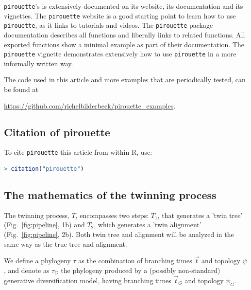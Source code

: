 \verb;pirouette;'s is extensively documented on its website,
its documentation and its vignettes.
The \verb;pirouette; website is a good starting point to learn
how to use \verb;pirouette;, as it links to tutorials and videos.
The \verb;pirouette; package documentation describes
all functions and liberally links to related functions.
All exported functions show a minimal example as part of their documentation.
The \verb;pirouette; vignette demonstrates extensively how 
to use \verb;pirouette; in a more informally written way. 

The code used in this article and more examples that are periodically 
tested, can be found at
\begin{sloppypar}
  \url{https://github.com/richelbilderbeek/pirouette_examples}. 
\end{sloppypar}

\subsection{Citation of pirouette}
\label{subsec:citation}

To cite \verb;pirouette; this article from within R, use:

\begin{lstlisting}[language=R]
> citation("pirouette")
\end{lstlisting}


\subsection{The mathematics of the twinning process}
\label{subsec:twinning_mathematics}

The twinning process, $T$, encompasses two steps:
$T_1$, that generates a 'twin tree' (Fig.~\ref{fig:pipeline}, 1b) 
and $T_2$, which generates a 'twin alignment' (Fig.~\ref{fig:pipeline}, 2b).
Both twin tree and alignment will be analyzed in the same way 
as the true tree and alignment.

We define a phylogeny $\tau$ as the combination of
branching times $\Vec{t}$ and topology $\psi$, 
and denote as $\tau_{\mathit{G}}$ the phylogeny 
produced by a (possibly non-standard) generative diversification model, 
having branching times $\Vec{t}_{\mathit{G}}$ and 
topology $\psi_{\mathit{G}}$.

